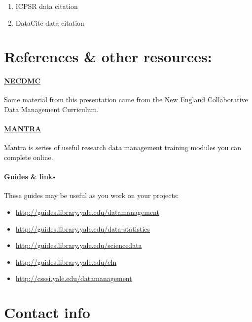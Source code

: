\documentclass[]{article}
\begin{document}
\begin{enumerate}
\def\labelenumi{\arabic{enumi}.}
\itemsep1pt\parskip0pt
\item
  ICPSR data citation
\item
  DataCite data citation
\end{enumerate}

\section{References \& other
resources:}\label{references-other-resources}

\paragraph{\href{http://library.umassmed.edu/necdmc/index}{NECDMC}}\label{necdmc}

Some material from this presentation came from the New England
Collaborative Data Management Curriculum.

\paragraph{\href{http://datalib.edina.ac.uk/mantra/}{MANTRA}}\label{mantra}

Mantra is series of useful research data management training modules you
can complete online.

\paragraph{Guides \& links}\label{guides-links}

These guides may be useful as you work on your projects: 

\begin{itemize}
\itemsep1pt\parskip0pt
\item
\url{http://guides.library.yale.edu/datamanagement} 
\item
\url{http://guides.library.yale.edu/data-statistics} 
\item
\url{http://guides.library.yale.edu/sciencedata} 
\item
\url{http://guides.library.yale.edu/eln} 
\item
\url{http://csssi.yale.edu/datamanagement}
\end{itemize}

\section{Contact info}\label{contact-info}
\end{document}
